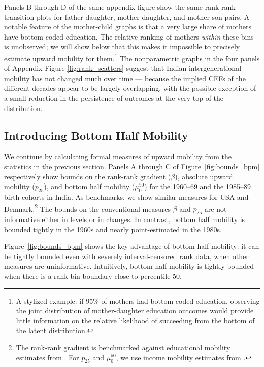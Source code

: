 \documentclass[12pt,letterpaper]{article}
\numberwithin{equation}{section}
\begin{document}
Panels B through D of the same appendix figure show the same rank-rank transition plots for father-daughter, mother-daughter, and mother-son pairs. A notable feature of the mother-child graphs is that a very large share of mothers have bottom-coded education. The relative ranking of mothers \textit{within} these bins is unobserved; we will show below that this makes it impossible to precisely estimate upward mobility for them.\footnote{A stylized example: if 95\% of mothers had bottom-coded education, observing the joint distribution of mother-daughter education outcomes would provide little information on the relative likelihood of succeeding from the bottom of the latent distribution.} The nonparametric graphs in the four panels of Appendix Figure \ref{fig:rank_scatters} suggest that Indian intergenerational mobility has not changed much over time --- because the implied CEFs of the different decades appear to be largely overlapping, with the possible exception of a small reduction in the persistence of outcomes at the very top of the distribution.

\subsection{Introducing Bottom Half Mobility}
\label{sec:comp_bounds} 

We continue by calculating formal measures of upward mobility from the statistics in the previous section. Panels A through C of Figure~\ref{fig:bounds_bpm} respectively show bounds on the rank-rank gradient ($\beta$), absolute upward mobility ($p_{25}$), and bottom half mobility ($\mu_0^{50}$) for the 1960--69 and the 1985--89 birth cohorts in India. As benchmarks, we show similar measures for USA and Denmark.\footnote{The rank-rank gradient is benchmarked against educational mobility estimates from . For $p_{25}$ and $\mu_0^{50}$, we use income mobility estimates from .} The bounds on the conventional measures $\beta$ and $p_{25}$ are not informative either in levels or in changes. In contrast, bottom half mobility is bounded tightly in the 1960s and nearly point-estimated in the 1980s.

Figure~\ref{fig:bounds_bpm} shows the key advantage of bottom half mobility: it can be tightly bounded even with severely interval-censored rank data, when other measures are uninformative. Intuitively, bottom half mobility is tightly bounded when there is a rank bin boundary close to percentile 50. 
\end{document}
